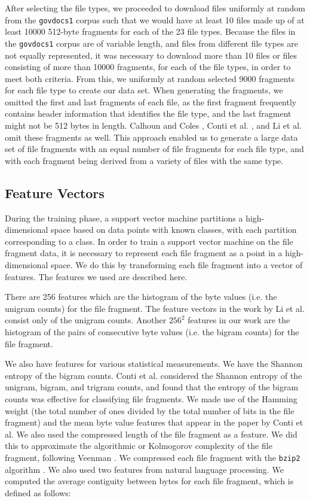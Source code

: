 \documentclass[letter,11pt]{article}
\begin{document}
After selecting the file types, we proceeded to download files uniformly at random from the \texttt{govdocs1} corpus such that we would have at least 10 files made up of at least 10000 512-byte fragments for each of the 23 file types. Because the files in the \texttt{govdocs1} corpus are of variable length, and files from different file types are not equally represented, it was necessary to download more than 10 files or files consisting of more than 10000 fragments, for each of the file types, in order to meet both criteria. From this, we uniformly at random selected 9000 fragments for each file type to create our data set. When generating the fragments, we omitted the first and last fragments of each file, as the first fragment frequently contains header information that identifies the file type, and the last fragment might not be 512 bytes in length. Calhoun and Coles \cite{Calhoun08}, Conti et al. \cite{Conti10}, and Li et al. \cite{Li10} omit these fragments as well. This approach enabled us to generate a large data set of file fragments with an equal number of file fragments for each file type, and with each fragment being derived from a variety of files with the same type.

\subsection{Feature Vectors}
\label{Subsection:FeatureVectors}
During the training phase, a support vector machine partitions a high-dimensional space based on data points with known classes, with each partition corresponding to a class. In order to train a support vector machine on the file fragment data, it is necessary to represent each file fragment as a point in a high-dimensional space. We do this by transforming each file fragment into a vector of features. The features we used are described here.

There are 256 features which are the histogram of the byte values (i.e. the unigram counts) for the file fragment. The feature vectors in the work by Li et al. \cite{Li10} consist only of the unigram counts. Another $256^2$ features in our work are the histogram of the pairs of consecutive byte values (i.e. the bigram counts) for the file fragment.

We also have features for various statistical measurements. We have the Shannon entropy \cite{Shannon48} of the bigram counts. Conti et al. \cite{Conti10} considered the Shannon entropy of the unigram, bigram, and trigram counts, and found that the entropy of the bigram counts was effective for classifying file fragments. We made use of the Hamming weight (the total number of ones divided by the total number of bits in the file fragment) and the mean byte value features that appear in the paper by Conti et al. We also used the compressed length of the file fragment as a feature. We did this to approximate the algorithmic or Kolmogorov complexity of the file fragment, following Veenman \cite{Veenman07}. We compressed each file fragment with the \texttt{bzip2} algorithm \cite{Seward01}. We also used two features from natural language processing. We computed the average contiguity between bytes for each file fragment, which is defined as follows: \\
\end{document}
